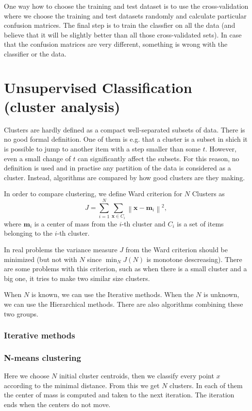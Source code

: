 One way how to choose the training and test dataset is to use the cross-validation where we choose the training and test datasets randomly and calculate particular confusion matrices. The final step is to train the classfier on all the data (and believe that it will be slightly better than all those cross-validated sets). In case that the confusion matrices are very different, something is wrong with the classifier or the data.

\chapter{Unsupervised Classification (cluster analysis)}
Clusters are hardly defined as a compact well-separated subsets of data. There is no good formal definition. One of them is e.g. that a cluster is a subset in shich it is possible to jump to another item with a step smaller than some $t$. However, even a small change of $t$ can significantly affect the subsets. For this reason, no definition is used and in practise any partition of the data is considered as a cluster. Instead, algorithms are compared by how good clusters are they making.

\begin{define}
In order to compare clustering, we define Ward criterion for $N$ Clusters as
$$ J=\sum_{i=1}^N \sum_{\textbf{x}\in C_i}\left\|\textbf{x}-\textbf{m}_i\right\|^2, $$
where $\textbf{m}_i$ is a center of mass from the $i$-th cluster and $C_i$ is a set of items belonging to the $i$-th cluster.
\end{define}

In real problems the variance measure $J$ from the Ward criterion should be minimized (but not with $N$ since $\min_N J(N)$ is monotone descreasing). There are some problems with this criterion, such as when there is a small cluster and a big one, it tries to make two similar size clusters.

When $N$ is known, we can use the Iterative methods. When the $N$ is unknown, we can use the Hierarchical methods. There are also algorithms combining these two groups.

\subsection{Iterative methods}
\subsection*{N-means clustering}
Here we choose $N$ initial cluster centroids, then we classify every point $x$ according to the minimal distance. From this we get $N$ clusters. In each of them the center of mass is computed and taken to the next iteration. The iteration ends when the centers do not move.

